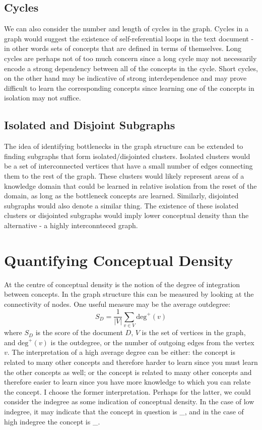 \documentclass[12pt]{article}
\begin{document}
\subsection{Cycles} 
We can also consider the number and length of cycles in the graph. Cycles in a graph would suggest the existence of self-referential loops in the text document - in other words sets of concepts that are defined in terms of themselves. Long cycles are perhaps not of too much concern since a long cycle may not necessarily encode a strong dependency between all of the concepts in the cycle. Short cycles, on the other hand may be indicative of strong interdependence and may prove difficult to learn the corresponding concepts since learning one of the concepts in isolation may not suffice.

\subsection{Isolated and Disjoint Subgraphs} 
The idea of identifying bottlenecks in the graph structure can be extended to finding subgraphs that form isolated/disjointed clusters. Isolated clusters would be a set of interconnected vertices that have a small number of edges connecting them to the rest of the graph. These clusters would likely represent areas of a knowledge domain that could be learned in relative isolation from the reset of the domain, as long as the bottleneck concepts are learned. Similarly, disjointed subgraphs would also denote a similar thing. The existence of these isolated clusters or disjointed subgraphs would imply lower conceptual density than the alternative - a highly interconnteced graph.

\section{Quantifying Conceptual Density} \label{sec:quantifying_conceptual_density}
At the centre of conceptual density is the notion of the degree of integration between concepts. In the graph structure this can be measured by looking at the connectivity of nodes. One useful measure may be the average outdegree:
\begin{equation} \label{eq:simple score}
    S_D = \frac{1}{|V|} \sum_{v \in V} \text{deg}^+(v)
\end{equation}
where $S_D$ is the score of the document $D$, $V$ is the set of vertices in the graph,  and $\text{deg}^+(v)$ is the outdegree, or the number of outgoing edges from the vertex $v$. The interpretation of a high average degree can be either: the concept is related to many other concepts and therefore harder to learn since you must learn the other concepts as well; or the concept is related to many other concepts and therefore easier to learn since you have more knowledge to which you can relate the concept. I choose the former interpretation. Perhaps for the latter, we could consider the indegree as some indication of conceptual density. In the case of low indegree, it may indicate that the concept in question is \_, and in the case of high indegree the concept is \_.
\end{document}
